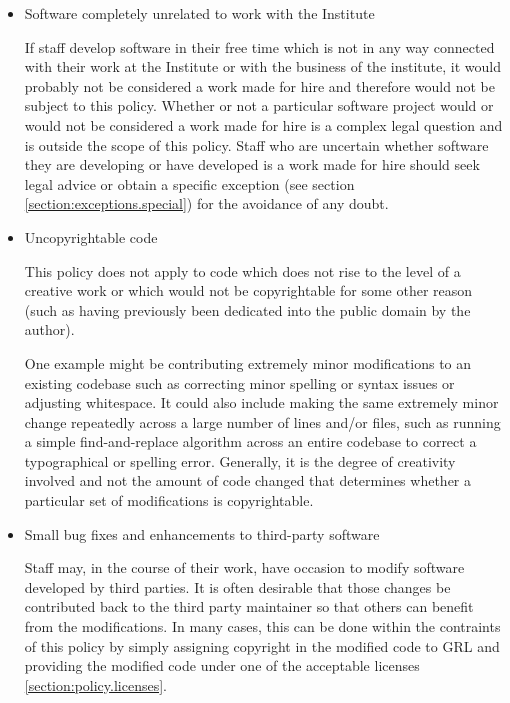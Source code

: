 \documentclass[10pt,a4paper]{article}
\begin{document}
\begin{itemize}

\item Software completely unrelated to work with the Institute

\par If staff develop software in their free time which is not in any way connected 
with their work at the Institute or with the business of the institute, it would 
probably not be considered a work made for hire and therefore would not be 
subject to this policy. Whether or not a particular software project would or 
would not be considered a work made for hire is a complex legal question and 
is outside the scope of this policy. Staff who are uncertain whether software 
they are developing or have developed is a work made for hire should seek 
legal advice or obtain a specific exception (see section \ref{section:exceptions.special}) 
for the avoidance of any doubt. 

\item Uncopyrightable code

\par This policy does not apply to code which does not rise to the level of a 
creative work or which would not be copyrightable for some other reason 
(such as having previously been dedicated into the public domain by the author). 

\par One example might be contributing extremely minor modifications to an existing 
codebase such as correcting minor spelling or syntax issues or adjusting whitespace. 
It could also include making the same extremely minor change repeatedly across a 
large number of lines and/or files, such as running a simple find-and-replace 
algorithm across an entire codebase to correct a typographical or spelling error. 
Generally, it is the degree of creativity involved and not the amount of code changed 
that determines whether a particular set of modifications is copyrightable. 


\item Small bug fixes and enhancements to third-party software

\par Staff may, in the course of their work, have occasion to modify software 
developed by third parties. It is often desirable that those changes be contributed 
back to the third party maintainer so that others can benefit from the modifications. 
In many cases, this can be done within the contraints of this policy by simply 
assigning copyright in the modified code to GRL and providing the modified code 
under one of the acceptable licenses \ref{section:policy.licenses}. 


\end{itemize}
\end{document}
